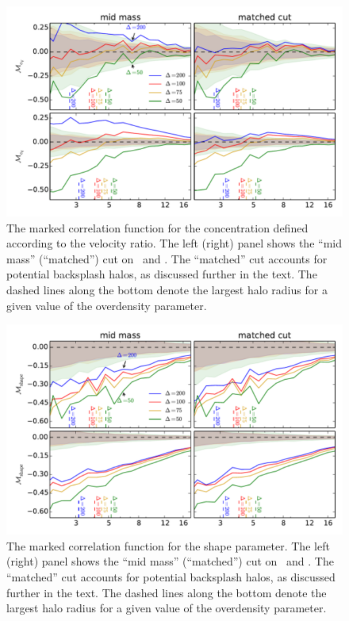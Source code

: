 \documentclass[usenatbib,usegraphicx,letterpaper]{mn2e}
\begin{document}
\begin{figure}
	\centering
	\includegraphics[width=.9\textwidth]{all_mcf_cV_z00_hostsvmatch.pdf}
	\caption{The marked correlation function for the concentration defined according to the velocity ratio. The left (right) panel shows the ``mid mass'' (``matched'') cut on \simA \ and \simB. The ``matched'' cut accounts for potential backsplash halos, as discussed further in the text. The dashed lines along the bottom denote the largest halo radius for a given value of the overdensity parameter.}
	\label{fig:hvm_mcf_cV}
\end{figure}

\begin{figure}
	\centering
	\includegraphics[width=.9\textwidth]{all_mcf_s_z00_hostsvmatch.pdf}
	\caption{The marked correlation function for the shape parameter. The left (right) panel shows the ``mid mass'' (``matched'') cut on \simA \ and \simB. The ``matched'' cut accounts for potential backsplash halos, as discussed further in the text. The dashed lines along the bottom denote the largest halo radius for a given value of the overdensity parameter.}
	\label{fig:hvm_mcf_s}
\end{figure}
\end{document}
